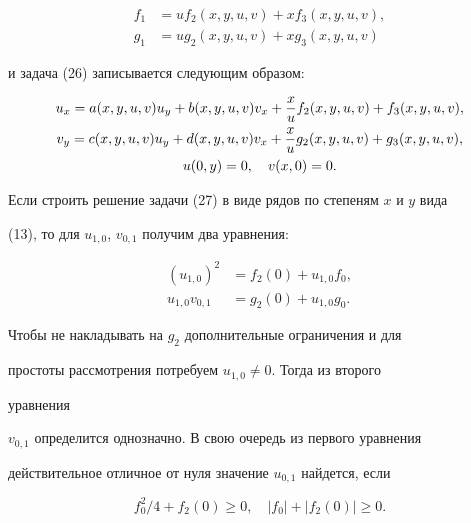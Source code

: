 \begin{align*}


f_1&=uf_2(x,y,u,v)+xf_3(x,y,u,v),\\


g_1&=ug_2(x,y,u,v)+xg_3(x,y,u,v)


\end{align*}


и задача (26) записывается следующим образом:


\begin{gather}


u_x=a(x,y,u,v)u_y+b(x,y,u,v)v_x+\frac{x}{u}f_2(x,y,u,v)+


f_3(x,y,u,v),\notag\\


v_y=c(x,y,u,v)u_y+d(x,y,u,v)v_x+\frac{x}{u}g_2(x,y,u,v)+


g_3(x,y,u,v),\\


u(0,y)=0,\quad v(x,0)=0.\notag


\end{gather}





Если строить решение задачи (27) в виде рядов по степеням $x$ и $y$ вида


(13), то для $u_{1,0}$, $v_{0,1}$ получим два уравнения:


\begin{equation}


\begin{split}


(u_{1,0})^2&=f_2(0)+u_{1,0}f_0,\\


u_{1,0}v_{0,1}&=g_2(0)+u_{1,0}g_0.


\end{split}


\end{equation}





Чтобы не накладывать на $g_2$ дополнительные ограничения и для


простоты рассмотрения потребуем $u_{1,0}\ne 0$. Тогда из второго


уравнения


$v_{0,1}$ определится однозначно. В свою очередь из первого уравнения


действительное отличное от нуля значение $u_{0,1}$ найдется, если


\begin{equation}


f^2_0/4+f_2(0)\ge 0,\quad |f_0|+|f_2(0)|\ge 0.


\end{equation}



